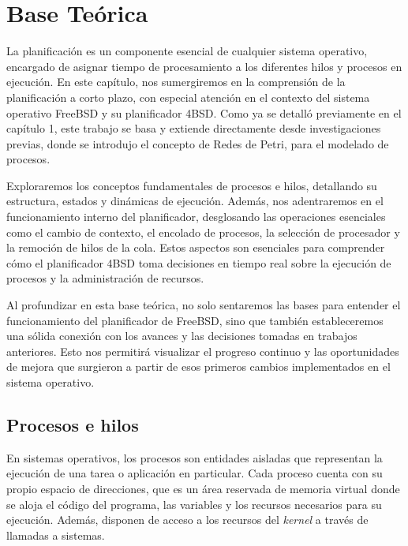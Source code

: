\chapter{Base Teórica}

La planificación es un componente esencial de cualquier sistema operativo, encargado de asignar tiempo de procesamiento a los diferentes hilos y procesos en ejecución. En este capítulo, nos sumergiremos en la comprensión de la planificación a corto plazo, con especial atención en el contexto del sistema operativo FreeBSD y su planificador 4BSD. Como ya se detalló previamente en el capítulo 1, este trabajo se basa y extiende directamente desde investigaciones previas\cite{bib1}, donde se introdujo el concepto de Redes de Petri, para el modelado de procesos.\par

Exploraremos los conceptos fundamentales de procesos e hilos, detallando su estructura, estados y dinámicas de ejecución. Además, nos adentraremos en el funcionamiento interno del planificador, desglosando las operaciones esenciales como el cambio de contexto, el encolado de procesos, la selección de procesador y la remoción de hilos de la cola. Estos aspectos son esenciales para comprender cómo el planificador 4BSD toma decisiones en tiempo real sobre la ejecución de procesos y la administración de recursos.\par

Al profundizar en esta base teórica, no solo sentaremos las bases para entender el funcionamiento del planificador de FreeBSD, sino que también estableceremos una sólida conexión con los avances y las decisiones tomadas en trabajos anteriores. Esto nos permitirá visualizar el progreso continuo y las oportunidades de mejora que surgieron a partir de esos primeros cambios implementados en el sistema operativo.\par

\section{Procesos e hilos}

En sistemas operativos, los procesos son entidades aisladas que representan la ejecución de una tarea o aplicación en particular. Cada proceso cuenta con su propio espacio de direcciones, que es un área reservada de memoria virtual donde se aloja el código del programa, las variables y los recursos necesarios para su ejecución. Además, disponen de acceso a los recursos del \textit{kernel} a través de llamadas a sistemas.\par


